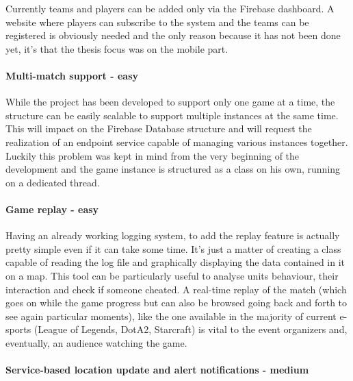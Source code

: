 	Currently teams and players can be added only via the Firebase dashboard. A website where players can subscribe to the system and the teams can be registered is obviously needed and the only reason because it has not been done yet, it's that the thesis focus was on the mobile part.
	
	\paragraph{Multi-match support - easy}
	
	While the project has been developed to support only one game at a time, the structure can be easily scalable to support multiple instances at the same time. This will impact on the Firebase Database structure and will request the realization of an endpoint service capable of managing various instances together. Luckily this problem was kept in mind from the very beginning of the development and the game instance is structured as a class on his own, running on a dedicated thread.
	
	\paragraph{Game replay - easy}
	
	Having an already working logging system, to add the replay feature is actually pretty simple even if it can take some time. It's just a matter of creating a class capable of reading the log file and graphically displaying the data contained in it on a map. This tool can be particularly useful to analyse units behaviour, their interaction and check if someone cheated. A real-time replay of the match (which goes on while the game progress but can also be browsed going back and forth to see again particular moments), like the one available in the majority of current e-sports (League of Legends, DotA2, Starcraft) is vital to the event organizers and, eventually, an audience watching the game.
	
	\paragraph{Service-based location update and alert notifications - medium}
	
